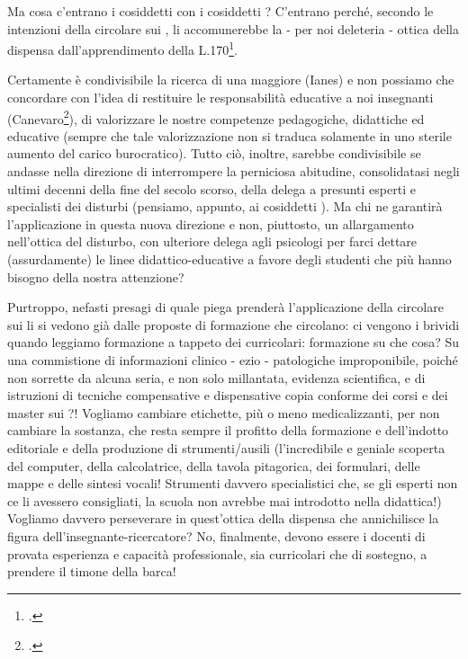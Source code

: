 Ma cosa c'entrano i cosiddetti  con i cosiddetti ? C'entrano perché, secondo le intenzioni della circolare sui , li accomunerebbe la - per noi deleteria - ottica della dispensa dall'apprendimento della L.170\footcite{legge170}.

Certamente è condivisibile la ricerca di una maggiore  (Ianes) e non possiamo che concordare con l'idea di restituire le responsabilità educative a noi insegnanti (Canevaro\footcite{Canevaro2013a}), di valorizzare le nostre competenze pedagogiche, didattiche ed educative (sempre che tale valorizzazione non si traduca solamente in uno sterile aumento del carico burocratico). Tutto ciò, inoltre, sarebbe condivisibile se andasse nella direzione di interrompere la perniciosa abitudine, consolidatasi negli ultimi decenni della fine del secolo scorso, della delega a presunti esperti e specialisti dei disturbi (pensiamo, appunto, ai cosiddetti ). Ma chi ne garantirà l'applicazione in questa nuova direzione e non, piuttosto, un allargamento nell'ottica del disturbo, con ulteriore delega agli psicologi per farci dettare (assurdamente) le linee didattico-educative a favore degli studenti che più hanno bisogno della nostra attenzione?

Purtroppo, nefasti presagi di quale piega prenderà l'applicazione della circolare sui  li si vedono già dalle proposte di formazione che circolano: ci vengono i brividi quando leggiamo formazione a tappeto dei curricolari: formazione su che cosa? Su una commistione di informazioni clinico - ezio - patologiche improponibile, poiché non sorrette da alcuna seria, e non solo millantata, evidenza scientifica, e di istruzioni di tecniche compensative e dispensative copia conforme dei corsi e dei master sui ?! Vogliamo cambiare etichette, più o meno medicalizzanti, per non cambiare la sostanza, che resta sempre il profitto della formazione e dell'indotto editoriale e della produzione di strumenti/ausili (l'incredibile e geniale scoperta del computer, della calcolatrice, della tavola pitagorica, dei formulari, delle mappe e delle sintesi vocali! Strumenti davvero specialistici che, se gli esperti non ce li avessero consigliati, la scuola non avrebbe mai introdotto nella didattica!) Vogliamo davvero perseverare in quest'ottica della dispensa che annichilisce la figura dell'insegnante-ricercatore? No, finalmente, devono essere i docenti di provata esperienza e capacità professionale, sia curricolari che di sostegno, a prendere il timone della barca!
